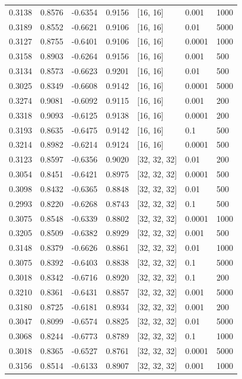 \begin{tabular}{lllllll}
0.3138 & 0.8576 & -0.6354 & 0.9156 & [16, 16] & 0.001 & 1000 \\
0.3189 & 0.8552 & -0.6621 & 0.9106 & [16, 16] & 0.01 & 5000 \\
0.3127 & 0.8755 & -0.6401 & 0.9106 & [16, 16] & 0.0001 & 1000 \\
0.3158 & 0.8903 & -0.6264 & 0.9156 & [16, 16] & 0.001 & 500 \\
0.3134 & 0.8573 & -0.6623 & 0.9201 & [16, 16] & 0.01 & 500 \\
0.3025 & 0.8349 & -0.6608 & 0.9142 & [16, 16] & 0.0001 & 5000 \\
0.3274 & 0.9081 & -0.6092 & 0.9115 & [16, 16] & 0.001 & 200 \\
0.3318 & 0.9093 & -0.6125 & 0.9138 & [16, 16] & 0.0001 & 200 \\
0.3193 & 0.8635 & -0.6475 & 0.9142 & [16, 16] & 0.1 & 500 \\
0.3214 & 0.8982 & -0.6214 & 0.9124 & [16, 16] & 0.0001 & 500 \\
0.3123 & 0.8597 & -0.6356 & 0.9020 & [32, 32, 32] & 0.01 & 200 \\
0.3054 & 0.8451 & -0.6421 & 0.8975 & [32, 32, 32] & 0.0001 & 500 \\
0.3098 & 0.8432 & -0.6365 & 0.8848 & [32, 32, 32] & 0.01 & 500 \\
0.2993 & 0.8220 & -0.6268 & 0.8743 & [32, 32, 32] & 0.1 & 500 \\
0.3075 & 0.8548 & -0.6339 & 0.8802 & [32, 32, 32] & 0.0001 & 1000 \\
0.3205 & 0.8509 & -0.6382 & 0.8929 & [32, 32, 32] & 0.001 & 500 \\
0.3148 & 0.8379 & -0.6626 & 0.8861 & [32, 32, 32] & 0.01 & 1000 \\
0.3075 & 0.8392 & -0.6403 & 0.8838 & [32, 32, 32] & 0.1 & 5000 \\
0.3018 & 0.8342 & -0.6716 & 0.8920 & [32, 32, 32] & 0.1 & 200 \\
0.3210 & 0.8361 & -0.6431 & 0.8857 & [32, 32, 32] & 0.001 & 5000 \\
0.3180 & 0.8725 & -0.6181 & 0.8934 & [32, 32, 32] & 0.001 & 200 \\
0.3047 & 0.8099 & -0.6574 & 0.8825 & [32, 32, 32] & 0.01 & 5000 \\
0.3068 & 0.8244 & -0.6773 & 0.8789 & [32, 32, 32] & 0.1 & 1000 \\
0.3018 & 0.8365 & -0.6527 & 0.8761 & [32, 32, 32] & 0.0001 & 5000 \\
0.3156 & 0.8514 & -0.6133 & 0.8907 & [32, 32, 32] & 0.001 & 1000 \\

\end{tabular}
